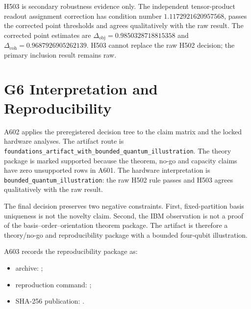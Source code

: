 \documentclass[11pt]{article}
\begin{document}
H503 is secondary robustness evidence only. The independent tensor-product
readout assignment correction has condition number \(1.1172921620957568\),
passes the corrected point thresholds and agrees qualitatively with the raw
result. The corrected point estimates are \(\Delta_{\mathrm{obj}} =
0.9850328718815358\) and \(\Delta_{\mathrm{coh}} =
0.9687926905262139\). H503 cannot replace the raw H502 decision; the primary
inclusion result remains raw.

\section{G6 Interpretation and Reproducibility}

A602 applies the preregistered decision tree to the claim matrix and the locked
hardware analyses. The artifact route is
\texttt{foundations\_artifact\_with\_bounded\_quantum\_illustration}. The
theory package is marked supported because the theorem, no-go and capacity
claims have zero unsupported rows in A601. The hardware interpretation is
\texttt{bounded\_quantum\_illustration}: the raw H502 rule passes and H503
agrees qualitatively with the raw result.

The final decision preserves two negative constraints. First, fixed-partition
basis uniqueness is not the novelty claim. Second, the IBM observation is not a
proof of the basis--order--orientation theorem package. The artifact is
therefore a theory/no-go and reproducibility package with a bounded four-qubit
illustration.

A603 records the reproducibility package as:
\begin{itemize}
  \item archive: ;
  \item reproduction command: ;
  \item SHA-256 publication: .
\end{itemize}
\end{document}
